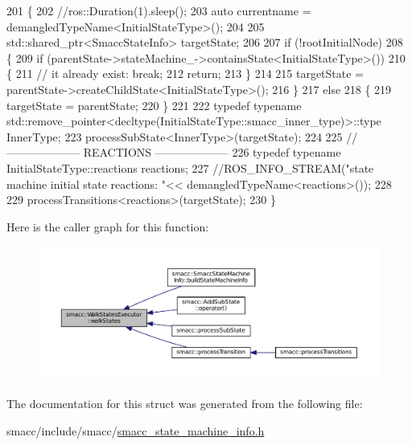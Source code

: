 \begin{DoxyCode}
201 \{
202     \textcolor{comment}{//ros::Duration(1).sleep();}
203     \textcolor{keyword}{auto} currentname = demangledTypeName<InitialStateType>();
204 
205     std::shared\_ptr<SmaccStateInfo> targetState;
206 
207     \textcolor{keywordflow}{if} (!rootInitialNode)
208     \{
209         \textcolor{keywordflow}{if} (parentState->stateMachine\_->containsState<InitialStateType>())
210         \{
211             \textcolor{comment}{// it already exist: break;}
212             \textcolor{keywordflow}{return};
213         \}
214 
215         targetState = parentState->createChildState<InitialStateType>();
216     \}
217     \textcolor{keywordflow}{else}
218     \{
219         targetState = parentState;
220     \}
221 
222     \textcolor{keyword}{typedef} \textcolor{keyword}{typename} std::remove\_pointer<decltype(InitialStateType::smacc\_inner\_type)>::type InnerType;
223     processSubState<InnerType>(targetState);
224 
225     \textcolor{comment}{// -------------------- REACTIONS --------------------}
226     \textcolor{keyword}{typedef} \textcolor{keyword}{typename} InitialStateType::reactions reactions;
227     \textcolor{comment}{//ROS\_INFO\_STREAM("state machine initial state reactions: "<< demangledTypeName<reactions>());}
228 
229     processTransitions<reactions>(targetState);
230 \}
\end{DoxyCode}


Here is the caller graph for this function\+:
\nopagebreak
\begin{figure}[H]
\begin{center}
\leavevmode
\includegraphics[width=350pt]{structsmacc_1_1WalkStatesExecutor_a11a2b02eafb62ec298bcf5ffbb32848b_icgraph}
\end{center}
\end{figure}




The documentation for this struct was generated from the following file\+:\begin{DoxyCompactItemize}
\item 
smacc/include/smacc/\hyperlink{smacc__state__machine__info_8h}{smacc\+\_\+state\+\_\+machine\+\_\+info.\+h}\end{DoxyCompactItemize}
